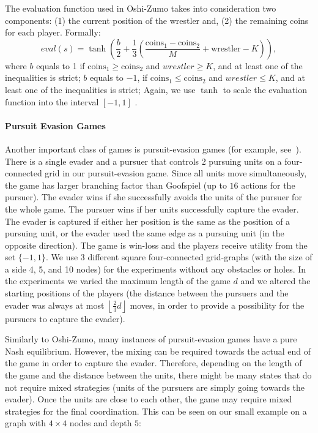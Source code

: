 \vspace{0.1cm}

The evaluation function used in Oshi-Zumo takes into consideration two components: (1) the current position of the wrestler and, (2) the remaining coins for each player. Formally:
$$
eval(s) = \tanh\left(\frac{b}{2}+\frac{1}{3}\left(\frac{\textrm{coins}_1 - \textrm{coins}_2}{M} + \textrm{wrestler} - K\right)\right),
$$
where $b$ equals to 1 if $\textrm{coins}_1 \geq \textrm{coins}_2$ and $wrestler \geq K$, and at least one of the inequalities is strict;
$b$ equals to $-1$, if $\textrm{coins}_1 \leq \textrm{coins}_2$ and $wrestler \leq K$, and at least one of the inequalities is strict;
Again, we use $\tanh$ to scale the evaluation function into the interval $[-1,1]$ .

\paragraph{\textbf{Pursuit Evasion Games}}

Another important class of games is pursuit-evasion games (for example, see~\cite{nguyen2013monte}).
There is a single evader and a pursuer that controls 2 pursuing units on a four-connected grid in our pursuit-evasion game.
Since all units move simultaneously, the game has larger branching factor than Goofspiel (up to $16$ actions for the pursuer).
The evader wins if she successfully avoids the units of the pursuer for the whole game.
The pursuer wins if her units successfully capture the evader. 
The evader is captured if either her position is the same as the position of a pursuing unit, or the evader used the same edge as a pursuing unit (in the opposite direction).
The game is win-loss and the players receive utility from the set $\lbrace -1, 1 \rbrace$.
We use $3$ different square four-connected grid-graphs (with the size of a side 4, 5, and 10 nodes) for the experiments without any obstacles or holes.
In the experiments we varied the maximum length of the game $d$ and we altered the starting positions of the players 
(the distance between the pursuers and the evader was always at most $\left\lfloor\frac{2}{3} d\right\rfloor$ moves, in order to provide a 
possibility for the pursuers to capture the evader).

Similarly to Oshi-Zumo, many instances of pursuit-evasion games have a pure Nash equilibrium.
However, the mixing can be required towards the actual end of the game in order to capture the evader.
Therefore, depending on the length of the game and the distance between the units, there might be many states that do not require mixed
strategies (units of the pursuers are simply going towards the evader).
Once the units are close to each other, the game may require mixed strategies for the final coordination.
This can be seen on our small example on a graph with $4\times4$ nodes and depth $5$:

